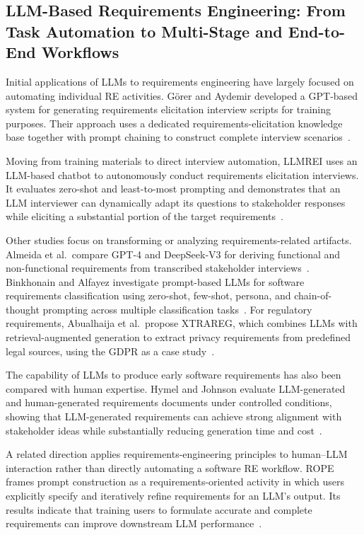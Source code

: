 \subsection{LLM-Based Requirements Engineering: From Task Automation to Multi-Stage and End-to-End Workflows}
\label{sec:rw-llm-re}

Initial applications of LLMs to requirements engineering have largely focused on automating individual RE activities. Görer and Aydemir developed a GPT-based system for generating requirements elicitation interview scripts for training purposes. Their approach uses a dedicated requirements-elicitation knowledge base together with prompt chaining to construct complete interview scenarios~\cite{gorer2024gpt}.

Moving from training materials to direct interview automation, LLMREI uses an LLM-based chatbot to autonomously conduct requirements elicitation interviews. It evaluates zero-shot and least-to-most prompting and demonstrates that an LLM interviewer can dynamically adapt its questions to stakeholder responses while eliciting a substantial portion of the target requirements~\cite{korn2025llmrei}.

Other studies focus on transforming or analyzing requirements-related artifacts. Almeida et al.\ compare GPT-4 and DeepSeek-V3 for deriving functional and non-functional requirements from transcribed stakeholder interviews~\cite{almeida2025elicitation}. Binkhonain and Alfayez investigate prompt-based LLMs for software requirements classification using zero-shot, few-shot, persona, and chain-of-thought prompting across multiple classification tasks~\cite{binkhonain2025prompts}. For regulatory requirements, Abualhaija et al.\ propose XTRAREG, which combines LLMs with retrieval-augmented generation to extract privacy requirements from predefined legal sources, using the GDPR as a case study~\cite{abualhaija2025llm}.

The capability of LLMs to produce early software requirements has also been compared with human expertise. Hymel and Johnson evaluate LLM-generated and human-generated requirements documents under controlled conditions, showing that LLM-generated requirements can achieve strong alignment with stakeholder ideas while substantially reducing generation time and cost~\cite{hymel2025analysis}.

A related direction applies requirements-engineering principles to human--LLM interaction rather than directly automating a software RE workflow. ROPE frames prompt construction as a requirements-oriented activity in which users explicitly specify and iteratively refine requirements for an LLM's output. Its results indicate that training users to formulate accurate and complete requirements can improve downstream LLM performance~\cite{ma2025rope}.

